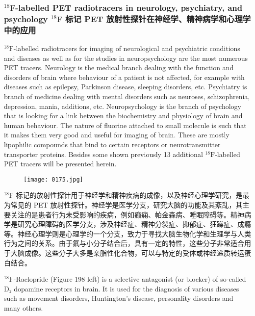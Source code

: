 \documentclass[dvipsnames, svgnames,a4paper,11pt]{article}
\begin{document}
\subsubsection{${}^\mathrm{18}\mathrm{F}$-labelled PET radiotracers in neurology, psychiatry, and psychology ${}^\mathrm{18}\mathrm{F}$ 标记 PET 放射性探针在神经学、精神病学和心理学中的应用}

${}^\mathrm{18}\mathrm{F}$-labelled radiotracers for imaging of neurological and psychiatric conditions and
diseases as well as for the studies in neuropsychology are the most numerous PET
tracers. Neurology is the medical branch dealing with the function and disorders of
brain where behaviour of a patient is not affected, for example with diseases such as
epilepsy, Parkinson disease, sleeping disorders, etc. Psychiatry is branch of
medicine dealing with mental disorders such as neuroses, schizophrenia, depression,
mania, additions, etc. Neuropsychology is the branch of psychology that is looking
for a link between the biochemistry and physiology of brain and human behaviour.
The nature of fluorine attached to small molecule is such that it makes them very
good and useful for imaging of brain. These are mostly lipophilic compounds that
bind to certain receptors or neurotransmitter transporter proteins. Besides some
shown previously 13 additional ${}^\mathrm{18}\mathrm{F}$-labelled PET tracers will be presented herein.

\begin{figure}[h]
	\centering
    \texttt{[image: 0175.jpg]}   
     \label{fig198}
\end{figure}

${}^\mathrm{18}\mathrm{F}$ 标记的放射性探针用于神经学和精神疾病的成像，以及神经心理学研究，是最为常见的 PET 放射性探针。神经学是医学分支，研究大脑的功能及其紊乱，其主要关注的是患者行为未受影响的疾病，例如癫痫、帕金森病、睡眠障碍等。精神病学是研究心理障碍的医学分支，涉及神经症、精神分裂症、抑郁症、狂躁症、成瘾等。神经心理学则是心理学的一个分支，致力于寻找大脑生物化学和生理学与人类行为之间的关系。由于氟与小分子结合后，具有一定的特性，这些分子非常适合用于大脑成像。这些分子大多是亲脂性化合物，可以与特定的受体或神经递质转运蛋白结合。

${}^\mathrm{18}\mathrm{F}$-Raclopride (Figure 198 left) is a selective antagonist (or blocker) of so-called D₂
dopamine receptors in brain. It is used for the diagnosis of various diseases such as
movement disorders, Huntington’s disease, personality disorders and many others. 
\end{document}
